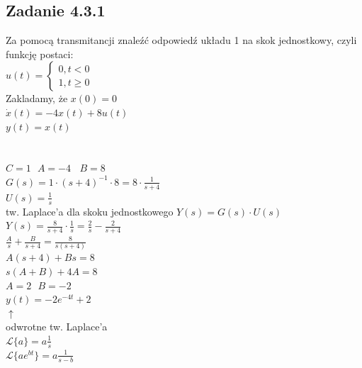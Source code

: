 \subsection*{Zadanie 4.3.1} {\color{darkgray}
	Za pomocą transmitancji znaleźć odpowiedź układu 1 na skok jednostkowy, czyli funkcję postaci:\\
	$u(t)=\begin{cases}0,t<0 \\ 1, t\geqslant 0 \end{cases}$\\
	Zakladamy, że $x(0)=0$\\
	$\dot{x}(t)=-4x(t)+8u(t)$\\
	$y(t)=x(t)$\\
}\lineh
\\\\
$C=1 \ \ \ A=-4 \ \ \ \ B=8$\\
$G(s)=1 \cdot (s+4)^{-1} \cdot 8 = 8 \cdot \frac{1}{s+4}$\\
$U(s)=\frac 1 s \ \ \ $\\ tw. Laplace'a dla skoku jednostkowego
$Y(s)=G(s) \cdot U(s)$\\
$Y(s)=\frac{8}{s+4} \cdot \frac{1}{s} = \frac{2}{s} - \frac{2}{s+4}$\\
$\frac{A}{s}+\frac{B}{s+4}=\frac{8}{s(s+4)}$\\
$A(s+4)+Bs=8$\\
$s(A+B)+4A=8$\\
$A=2 \ \ \ B=-2$\\
$\boxed{y(t)=-2e^{-4t}+2}$\\ 
$\uparrow$\\
odwrotne tw. Laplace'a\\
$\mathcal{L}\{a\}=a\frac 1 s$\\
$\mathcal{L}\{ae^{bt}\}=a\frac {1}{s-b}$\\

\pagebreak
